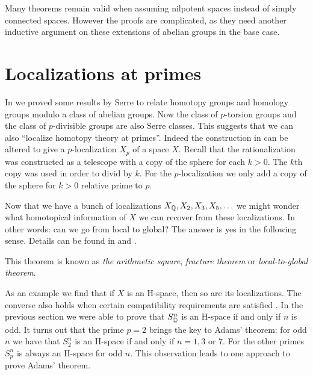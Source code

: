 Many theorems remain valid when assuming nilpotent spaces instead of simply connected spaces. However the proofs are complicated, as they need another inductive argument on these extensions of abelian groups in the base case.

\section{Localizations at primes}
In  we proved some results by Serre to relate homotopy groups and homology groups modulo a class of abelian groups. Now the class of $p$-torsion groups and the class of $p$-divisible groups are also Serre classes. This suggests that we can also ``localize homotopy theory at primes''. Indeed the construction in  can be altered to give a $p$-localization $X_p$ of a space $X$. Recall that the rationalization was constructed as a telescope with a copy of the sphere for each $k > 0$. The $k$th copy was used in order to divid by $k$. For the $p$-localization we only add a copy of the sphere for $k > 0$ relative prime to $p$.

Now that we have a bunch of localizations $X_{\mathbb{Q}}, X_2, X_3, X_5, \ldots$ we might wonder what homotopical information of $X$ we can recover from these localizations. In other words: can we go from local to global? The answer is yes in the following sense. Details can be found in \cite{may2} and \cite{sullivan}.


This theorem is known as \emph{the arithmetic square}, \emph{fracture theorem} or \emph{local-to-global theorem}.

As an example we find that if $X$ is an H-space, then so are its localizations. The converse also holds when certain compatibility requirements are satisfied \cite{sullivan}. In the previous section we were able to prove that $S^n_{\mathbb{Q}}$ is an H-space if and only if $n$ is odd. It turns out that the prime $p=2$ brings the key to Adams' theorem: for odd $n$ we have that $S^n_2$ is an H-space if and only if $n=1, 3$ or $7$. For the other primes $S^n_p$ is always an H-space for odd $n$. This observation leads to one approach to prove Adams' theorem.

\blankpage
